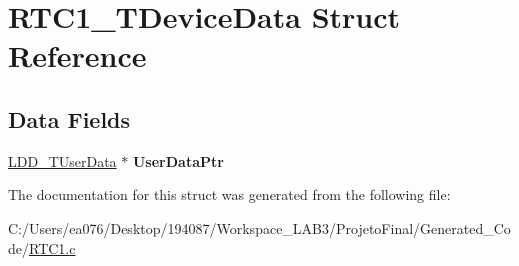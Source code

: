 \hypertarget{struct_r_t_c1___t_device_data}{\section{R\-T\-C1\-\_\-\-T\-Device\-Data Struct Reference}
\label{struct_r_t_c1___t_device_data}
}
\subsection*{Data Fields}
\begin{DoxyCompactItemize}
\item 
\hypertarget{struct_r_t_c1___t_device_data_aa55f33639a857728a2f652e2b486aa92}{\hyperlink{group___p_e___types__module_ga0b66a73f87238a782318aa0be7578e35}{L\-D\-D\-\_\-\-T\-User\-Data} $\ast$ {\bfseries User\-Data\-Ptr}}\label{struct_r_t_c1___t_device_data_aa55f33639a857728a2f652e2b486aa92}

\end{DoxyCompactItemize}


The documentation for this struct was generated from the following file\-:\begin{DoxyCompactItemize}
\item 
C\-:/\-Users/ea076/\-Desktop/194087/\-Workspace\-\_\-\-L\-A\-B3/\-Projeto\-Final/\-Generated\-\_\-\-Code/\hyperlink{_r_t_c1_8c}{R\-T\-C1.\-c}\end{DoxyCompactItemize}
